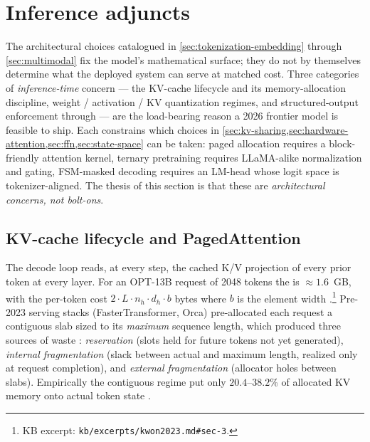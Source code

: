 
\section{Inference adjuncts}
\label{sec:inference-adjuncts}

The architectural choices catalogued in \cref{sec:tokenization-embedding}
through \cref{sec:multimodal} fix the model's mathematical surface; they
do not by themselves determine what the deployed system can serve at
matched cost. Three categories of \emph{inference-time} concern --- the
KV-cache lifecycle and its memory-allocation discipline, weight /
activation / KV quantization regimes, and structured-output enforcement
through  --- are the load-bearing reason a 2026
frontier model is feasible to ship. Each constrains which choices in
\cref{sec:kv-sharing,sec:hardware-attention,sec:ffn,sec:state-space}
can be taken: paged allocation requires a block-friendly attention
kernel, ternary pretraining requires LLaMA-alike normalization and
gating, FSM-masked decoding requires an LM-head whose logit space is
tokenizer-aligned. The thesis of this section is that these are
\emph{architectural concerns, not bolt-ons}.

\subsection{KV-cache lifecycle and PagedAttention}
\label{sec:kv-paged}

The  decode loop reads, at every step, the cached K/V
projection of every prior token at every layer. For an OPT-13B request
of 2048 tokens the  is $\approx 1.6$~GB, with the per-token
cost $2 \cdot L \cdot n_h \cdot d_h \cdot b$ bytes where $b$ is the
element width \citep[\S 3]{kwon2023}.\footnote{KB excerpt:
\texttt{kb/excerpts/kwon2023.md\#sec-3}.} Pre-2023 serving stacks
(FasterTransformer, Orca) pre-allocated each request a contiguous slab
sized to its \emph{maximum} sequence length, which produced three
sources of waste \citep[\S 3]{kwon2023}: \emph{reservation} (slots
held for future tokens not yet generated), \emph{internal
fragmentation} (slack between actual and maximum length, realized only
at request completion), and \emph{external fragmentation} (allocator
holes between slabs). Empirically the contiguous regime put only
$20.4$--$38.2$\% of allocated KV memory onto actual token state
\citep[\S 3, Fig.~2]{kwon2023}.

